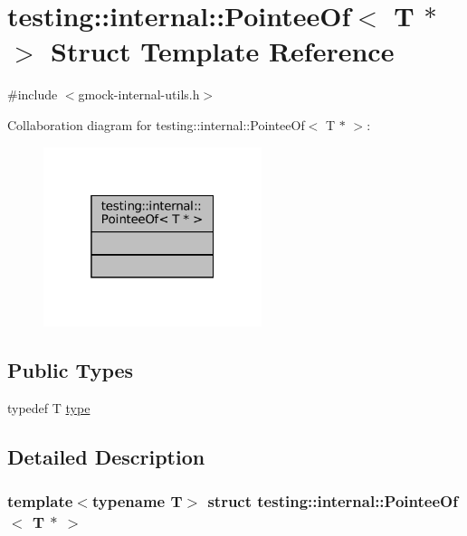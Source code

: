 \hypertarget{structtesting_1_1internal_1_1PointeeOf_3_01T_01_5_01_4}{}\section{testing\+:\+:internal\+:\+:Pointee\+Of$<$ T $\ast$ $>$ Struct Template Reference}
\label{structtesting_1_1internal_1_1PointeeOf_3_01T_01_5_01_4}


{\ttfamily \#include $<$gmock-\/internal-\/utils.\+h$>$}



Collaboration diagram for testing\+:\+:internal\+:\+:Pointee\+Of$<$ T $\ast$ $>$\+:
\nopagebreak
\begin{figure}[H]
\begin{center}
\leavevmode
\includegraphics[width=181pt]{structtesting_1_1internal_1_1PointeeOf_3_01T_01_5_01_4__coll__graph}
\end{center}
\end{figure}
\subsection*{Public Types}
\begin{DoxyCompactItemize}
\item 
typedef T \hyperlink{structtesting_1_1internal_1_1PointeeOf_3_01T_01_5_01_4_a91dde514cd3a8c07cedbe5336c36a55f}{type}
\end{DoxyCompactItemize}


\subsection{Detailed Description}
\subsubsection*{template$<$typename T$>$\newline
struct testing\+::internal\+::\+Pointee\+Of$<$ T $\ast$ $>$}



